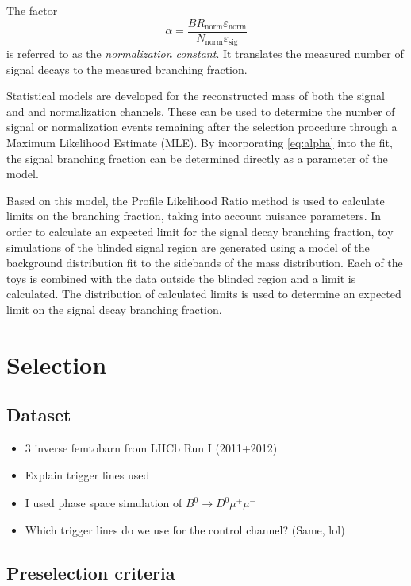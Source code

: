 The factor
\begin{equation}
  \alpha = \frac{BR_\text{norm} \varepsilon_\text{norm}}{N_\text{norm} \varepsilon_\text{sig}}
  \label{eq:alpha}
\end{equation}
is referred to as the \emph{normalization constant}.
It translates the measured number of signal decays to the measured branching fraction.

Statistical models are developed for the reconstructed mass of both the signal and and normalization channels.
These can be used to determine the number of signal or normalization events remaining after the selection procedure through a Maximum Likelihood Estimate (MLE).
By incorporating \eqref{eq:alpha} into the fit, the signal branching fraction can be determined directly as a parameter of the model.

Based on this model, the Profile Likelihood Ratio method is used to calculate limits on the branching fraction, taking into account nuisance parameters.
In order to calculate an expected limit for the signal decay branching fraction, toy simulations of the blinded signal region are generated using a model of the background distribution fit to the sidebands of the mass distribution.
Each of the toys is combined with the data outside the blinded region and a limit is calculated.
The distribution of calculated limits is used to determine an expected limit on the signal decay branching fraction.

\chapter{Selection} %

\section{Dataset}

\begin{itemize}
  \item 3 inverse femtobarn from LHCb Run I (2011+2012)
  \item Explain trigger lines used
  \item I used phase space simulation of $B^0\to\overline{D^0}μ^+μ^-$
  \item Which trigger lines do we use for the control channel? (Same, lol)
\end{itemize}

\section{Preselection criteria}

